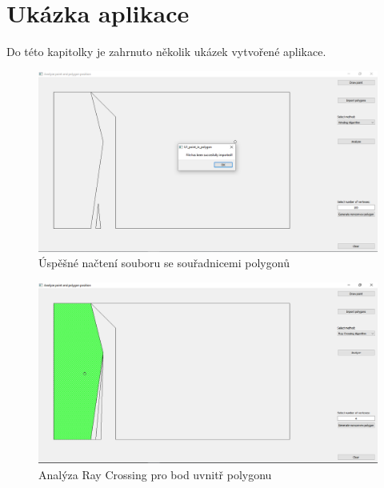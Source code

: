 \documentclass[a4paper,11pt,twoside]{article}
\begin{document}
\newpage
{}

\vspace*{-1cm}
\section{Ukázka aplikace}
\noindent
\large
Do této kapitolky je zahrnuto několik ukázek vytvořené aplikace.

\vspace{0.2cm}
\begin{figure}[hbt!] 
\begin{center}
\includegraphics[width=15cm]{pictures/success.png} 
\caption[Úspěšné načtení souboru se souřadnicemi polygonů]{Úspěšné načtení souboru se souřadnicemi polygonů}
\label{fig:success}
\end{center}
\end{figure}

\vspace{0.2cm}
\begin{figure}[hbt!] 
\begin{center}
\includegraphics[width=15cm]{pictures/rayinside.png} 
\caption[Analýza Ray Crossing pro bod uvnitř polygonu]{Analýza Ray Crossing pro bod uvnitř polygonu}
\label{fig:rayinside}
\end{center}
\end{figure}
\end{document}
